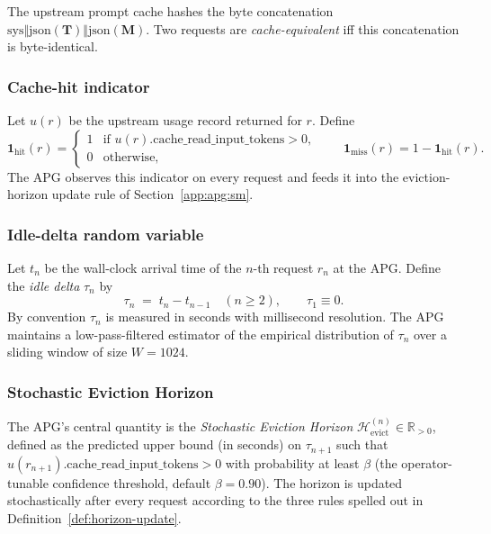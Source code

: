 The upstream prompt cache hashes the byte concatenation
$\mathrm{sys} \Vert \mathrm{json}(\mathbf{T}) \Vert \mathrm{json}(\mathbf{M})$.
Two requests are \emph{cache-equivalent} iff this concatenation is
byte-identical.

\subsubsection{Cache-hit indicator}

Let $u(r)$ be the upstream usage record returned for $r$. Define
\begin{equation}
  \mathbf{1}_{\text{hit}}(r) =
    \begin{cases}
      1 & \text{if } u(r).\mathrm{cache\_read\_input\_tokens} > 0, \\
      0 & \text{otherwise},
    \end{cases}
  \qquad
  \mathbf{1}_{\text{miss}}(r) = 1 - \mathbf{1}_{\text{hit}}(r).
  \label{eq:hit-indicator}
\end{equation}
The APG observes this indicator on every request and feeds it into
the eviction-horizon update rule of
Section~\ref{app:apg:sm}.

\subsubsection{Idle-delta random variable}

Let $t_n$ be the wall-clock arrival time of the $n$-th request
$r_n$ at the APG. Define the \emph{idle delta} $\tau_n$ by
\[
  \tau_n \;=\; t_n - t_{n-1} \quad (n \ge 2), \qquad
  \tau_1 \equiv 0.
\]
By convention $\tau_n$ is measured in seconds with
millisecond resolution. The APG maintains a low-pass-filtered
estimator of the empirical distribution of $\tau_n$ over a sliding
window of size $W=1024$.

\subsubsection{Stochastic Eviction Horizon}

The APG's central quantity is the \emph{Stochastic Eviction Horizon}
$\mathcal{H}_{\text{evict}}^{(n)} \in \mathbb{R}_{>0}$, defined as
the predicted upper bound (in seconds) on $\tau_{n+1}$ such that
$u(r_{n+1}).\mathrm{cache\_read\_input\_tokens} > 0$ with
probability at least $\beta$ (the operator-tunable confidence
threshold, default $\beta = 0.90$). The horizon is updated
stochastically after every request according to the three rules
spelled out in Definition~\ref{def:horizon-update}.

